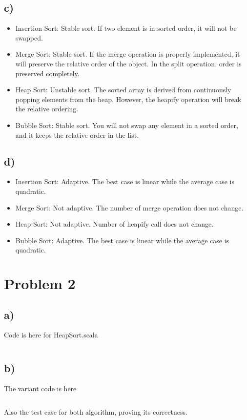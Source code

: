 \documentclass{article}
\begin{document}
\subsection*{c)}
\begin{itemize}
    \item Insertion Sort: Stable sort. If two element is in sorted order, it will not be swapped.
    \item Merge Sort: Stable sort. If the merge operation is properly implemented, it will preserve
        the relative order of the object. In the split operation, order is preserved completely.
    \item Heap Sort: Unstable sort. The sorted array is derived from continuously popping elements from
        the heap. However, the heapify operation will break the relative ordering.
    \item Bubble Sort: Stable sort. You will not swap any element in a sorted order, and it keeps the
        relative order in the list.
\end{itemize}
\subsection*{d)}
\begin{itemize}
    \item Insertion Sort: Adaptive. The best case is linear while the average case is quadratic.
    \item Merge Sort: Not adaptive. The number of merge operation does not change.
    \item Heap Sort: Not adaptive. Number of heapify call does not change.
    \item Bubble Sort: Adaptive. The best case is linear while the average case is quadratic.
\end{itemize}
\section*{Problem 2}
\subsection*{a)}
Code is here for HeapSort.scala
\inputminted{Scala}{HeapSort/src/main/scala/HeapSort.scala}
\subsection*{b)}
The variant code is here
\inputminted{Scala}{HeapSort/src/main/scala/HeapSortVariant.scala}
Also the test case for both algorithm, proving its correctness.
\inputminted{Scala}{HeapSort/src/test/scala/HeapSortTest.scala}
\end{document}
